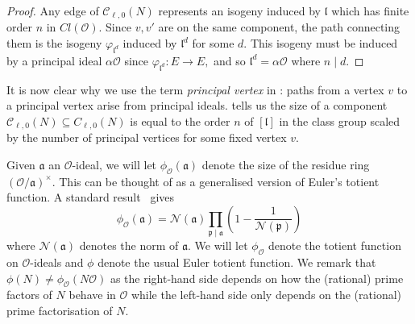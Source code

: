 \documentclass[11pt,a4paper]{amsart}
\theoremstyle{plain}
\theoremstyle{definition}
\theoremstyle{remark}
\begin{document}
\begin{proof}
Any edge of $\mathcal{C}_{\ell,0}(N)$ represents an isogeny induced by $\mathfrak{l}$ which has finite order $n$ in $Cl(\mathcal{O}).$ Since $v, v'$ are on the same component, the path connecting them is the isogeny $\varphi_{\mathfrak{l}^d}$ induced by $\mathfrak{l}^d$ for some $d.$ This isogeny must be induced by a principal ideal $\alpha\mathcal{O}$ since $\varphi_{\mathfrak{l}^d}: E \to E,$ and so $\mathfrak{l}^d = \alpha\mathcal{O}$ where $n \mid d.$
\end{proof}
It is now clear why we use the term \emph{principal vertex} in : paths from a vertex $v$ to a principal vertex arise from principal ideals.  tells us the size of a component $\mathcal{C}_{\ell,0}(N) \subseteq C_{\ell,0}(N)$ is equal to the order $n$ of $[\mathfrak{l}]$ in the class group scaled by the number of principal vertices for some fixed vertex $v.$

Given $\mathfrak{a}$ an $\mathcal{O}$-ideal, we will let $\phi_{\mathcal{O}}(\mathfrak{a})$ denote the size of the residue ring $(\mathcal{O}/\mathfrak{a})^{\times}.$ This can be thought of as a generalised version of Euler's totient function. A standard result~\cite[Thm.~1.19]{narkiewicz_ant} gives
\begin{equation}\label{eq:general-euler-phi}
  \phi_{\mathcal{O}}(\mathfrak{a}) = \mathcal{N}(\mathfrak{a}) \prod_{\mathfrak{p} \mid \mathfrak{a}}\left( 1 - \frac{1}{\mathcal{N}(\mathfrak{p})} \right)
\end{equation}
where $\mathcal{N}(\mathfrak{a})$ denotes the norm of $\mathfrak{a}.$ We will let $\phi_{\mathcal{O}}$ denote the totient function on $\mathcal{O}$-ideals and $\phi$ denote the usual Euler totient function. We remark that $\phi(N) \neq \phi_{\mathcal{O}}(N \mathcal{O})$ as the right-hand side depends on how the (rational) prime factors of $N$ behave in $\mathcal{O}$ while the left-hand side only depends on the (rational) prime factorisation of $N.$
\end{document}
